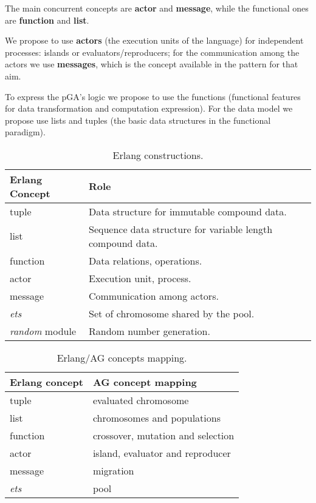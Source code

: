 
The main concurrent concepts are \textbf{actor} and \textbf{message}, while the functional ones are \textbf{function} and \textbf{list}.

We propose to use \textbf{actors} (the execution units of the language) for independent processes: islands or evaluators/reproducers; for the communication among the actors we use \textbf{messages}, which is the concept available in the pattern for that aim.

To express the pGA’s logic we propose to use the functions (functional features for data transformation and computation expression). For the data model we propose use lists and tuples (the basic data structures in the functional paradigm).


\begin{table*}\small
  \centering
   \caption{Erlang constructions.}\label{erlConstructions}
\begin{tabular}{|>{\centering\arraybackslash}p{3.4cm}|>{\centering\arraybackslash}p{7cm}|}
  \hline
  \textbf{Erlang Concept} & \textbf{Role} \tabularnewline
     \hline
  tuple & Data structure for immutable compound data. \tabularnewline
     \hline
  list & Sequence data structure for variable length compound data. \tabularnewline
     \hline
  function & Data relations, operations. \tabularnewline
     \hline
  actor & Execution unit, process. \tabularnewline
     \hline
  message & Communication among actors. \tabularnewline
     \hline
  {\em ets} & Set of chromosome shared by the pool. \tabularnewline
     \hline
  {\em random} module& Random number generation. \tabularnewline
  \hline
\end{tabular}

\end{table*}

\begin{table*}\small
  \centering
  \caption{Erlang/AG concepts mapping.}\label{erlAGRelation}
\begin{tabular}{|>{\centering\arraybackslash}p{3cm}|>{\centering\arraybackslash}p{6cm}|}
  \hline
  \textbf{Erlang concept} & \textbf{AG concept mapping} \tabularnewline
     \hline
  tuple & evaluated chromosome \tabularnewline
     \hline
  list & chromosomes and populations \tabularnewline
     \hline
  function & crossover, mutation and selection \tabularnewline
     \hline
  actor  & island, evaluator and reproducer \tabularnewline
     \hline
  message & migration \tabularnewline
     \hline
  {\em ets}  & pool \tabularnewline
     \hline

\end{tabular}

\end{table*}


